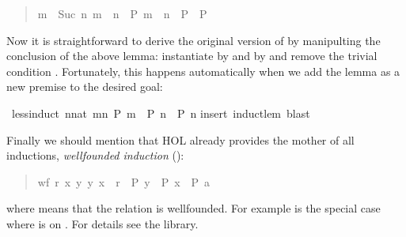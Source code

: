 \begin{isabelle}
\begin{isamarkuptext}
\begin{quote}
\begin{isabelle}%
{\isasymlbrakk}\mbox{m}\ {\isacharless}\ Suc\ \mbox{n}{\isacharsemicolon}\ \mbox{m}\ {\isacharless}\ \mbox{n}\ {\isasymLongrightarrow}\ \mbox{P}{\isacharsemicolon}\ \mbox{m}\ {\isacharequal}\ \mbox{n}\ {\isasymLongrightarrow}\ \mbox{P}{\isasymrbrakk}\ {\isasymLongrightarrow}\ \mbox{P}
\end{isabelle}%

\end{quote}

Now it is straightforward to derive the original version of
 by manipulting the conclusion of the above lemma:
instantiate  by  and  by  and
remove the trivial condition . Fortunately, this
happens automatically when we add the lemma as a new premise to the
desired goal:%
\end{isamarkuptext}%
\ less{\isacharunderscore}induct{\isacharcolon}\ {\isachardoublequote}{\isacharparenleft}{\isasymAnd}n{\isacharcolon}{\isacharcolon}nat{\isachardot}\ {\isasymforall}m{\isacharless}n{\isachardot}\ P\ m\ {\isasymLongrightarrow}\ P\ n{\isacharparenright}\ {\isacharequal}{\isacharequal}{\isachargreater}\ P\ n{\isachardoublequote}\isanewline
{}insert\ induct{\isacharunderscore}lem{\isacharcomma}\ blast{\isacharparenright}%
\begin{isamarkuptext}%
\noindent
Finally we should mention that HOL already provides the mother of all
inductions, \emph{wellfounded induction} ():
\begin{quote}

\begin{isabelle}%
{\isasymlbrakk}wf\ \mbox{r}{\isacharsemicolon}\ {\isasymAnd}\mbox{x}{\isachardot}\ {\isasymforall}\mbox{y}{\isachardot}\ {\isacharparenleft}\mbox{y}{\isacharcomma}\ \mbox{x}{\isacharparenright}\ {\isasymin}\ \mbox{r}\ {\isasymlongrightarrow}\ \mbox{P}\ \mbox{y}\ {\isasymLongrightarrow}\ \mbox{P}\ \mbox{x}{\isasymrbrakk}\ {\isasymLongrightarrow}\ \mbox{P}\ \mbox{a}
\end{isabelle}%

\end{quote}
where  means that the relation  is wellfounded.
For example  is the special case where  is \isa{<} on .
For details see the library.%
\end{isamarkuptext}%
\end{isabelle}%
